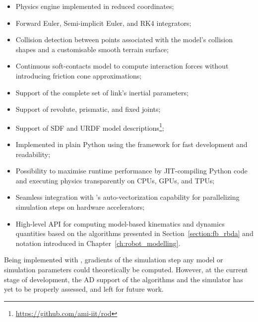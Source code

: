 \begin{itemize}
    \item Physics engine implemented in reduced coordinates;
    \item Forward Euler, Semi-implicit Euler, and \ac{RK4} integrators;
    \item Collision detection between points associated with the model's collision shapes and a customisable smooth terrain surface;
    \item Continuous soft-contacts model to compute interaction forces without introducing friction cone approximations;
    \item Support of the complete set of link's inertial parameters;
    \item Support of revolute, prismatic, and fixed joints; 
    \item Support of \ac{SDF} and \ac{URDF} model descriptions\footnote{\url{https://github.com/ami-iit/rod}};
    \item Implemented in plain Python using the \jax framework for fast development and readability;
    \item Possibility to maximise runtime performance by \ac{JIT}-compiling Python code and executing physics transparently on \acp{CPU}, \acp{GPU}, and \acp{TPU};
    \item Seamless integration with \jax's auto-vectorization capability for parallelizing simulation steps on hardware accelerators;
    \item High-level API for computing model-based kinematics and dynamics quantities based on the algorithms presented in Section~\ref{section:fb_rbda} and notation introduced in Chapter~\ref{ch:robot_modelling}.
\end{itemize}

\begin{remark*}[\ac{AD} support]
%
Being implemented with \jax, gradients of the simulation step \wrt any model or simulation parameters could theoretically be computed.
However, at the current stage of development, the \ac{AD} support of the algorithms and the simulator has yet to be properly assessed, and left for future work.
%
\end{remark*}

